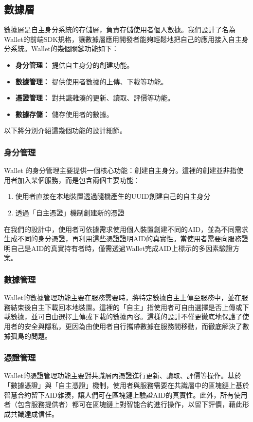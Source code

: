 \subsection{數據層}
數據層是自主身分系統的存儲層，負責存儲使用者個人數據。我們設計了名為Wallet的前端SDK規格，讓數據層應用開發者能夠輕鬆地把自己的應用接入自主身分系統。Wallet的幾個關鍵功能如下：
\begin{itemize}
  \item \textbf{身分管理：} 提供自主身分的創建功能。
  \item \textbf{數據管理：} 提供使用者數據的上傳、下載等功能。
  \item \textbf{憑證管理：} 對共識雜湊的更新、讀取、評價等功能。
  \item \textbf{數據存儲：} 儲存使用者的數據。
\end{itemize}
以下將分別介紹這幾個功能的設計細節。
\subsubsection{身分管理}
Wallet 的身分管理主要提供一個核心功能：創建自主身分。這裡的創建並非指使用者加入某個服務，而是包含兩個主要功能：
\begin{enumerate}
  \item 使用者直接在本地裝置透過隨機產生的UUID創建自己的自主身分
  \item 透過「自主憑證」機制創建新的憑證
\end{enumerate}
在我們的設計中，使用者可依據需求使用個人裝置創建不同的AID，並為不同需求生成不同的身分憑證，再利用這些憑證證明AID的真實性。當使用者需要向服務證明自己是AID的真實持有者時，僅需透過Wallet完成AID上標示的多因素驗證方案。
\subsubsection{數據管理}
Wallet的數據管理功能主要在服務需要時，將特定數據自主上傳至服務中，並在服務結束後自主下載回本地裝置。這裡的「自主」指使用者可自由選擇是否上傳或下載數據，並可自由選擇上傳或下載的數據內容。這樣的設計不僅更徹底地保護了使用者的安全與隱私，更因為由使用者自行攜帶數據在服務間移動，而徹底解決了數據孤島的問題。
\subsubsection{憑證管理}
Wallet的憑證管理功能主要對共識層內憑證進行更新、讀取、評價等操作。基於「數據憑證」與「自主憑證」機制，使用者與服務需要在共識層中的區塊鏈上基於智慧合約留下AID雜湊，讓人們可在區塊鏈上驗證AID的真實性。此外，所有使用者（包含服務提供者）都可在區塊鏈上對智能合約進行操作，以留下評價，藉此形成共識達成信任。

